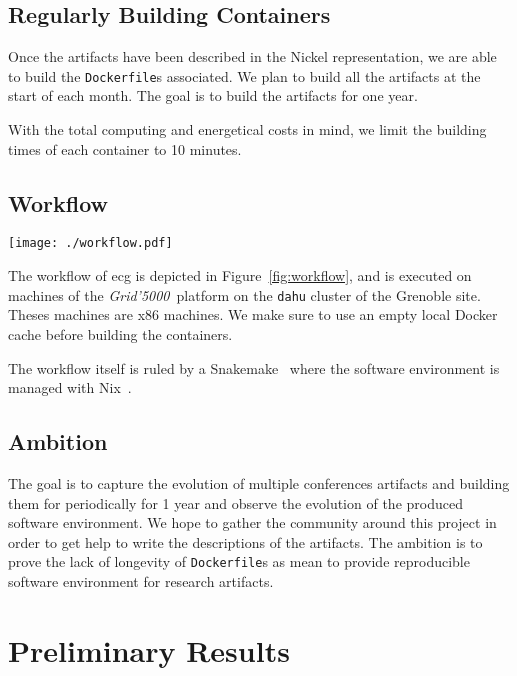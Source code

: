 \documentclass[sigconf,natbib=false]{acmart}
\newcommand{\grid}{\emph{Grid'5000}}
\newcommand{\df}{\texttt{Dockerfile}}
\newcommand{\todo}[1]{{\color{red}{TODO: #1}}}
\begin{document}
\subsection{Regularly Building Containers}

Once the artifacts have been described in the Nickel representation, we are able to build the \df s associated.
We plan to build all the artifacts at the start of each month.
The goal is to build the artifacts for one year.

\todo{building patterns, exponential decay}


With the total computing and energetical costs in mind, we limit the building times of each container to 10 minutes.


\subsection{Workflow}

\begin{figure*}
  \centering
  \texttt{[image: ./workflow.pdf]}
  \caption{Workflow}\label{fig:workflow}
\end{figure*}

The workflow of ecg is depicted in Figure~\ref{fig:workflow}, and is executed on machines of the \grid\ platform \cite{grid5000} on the \texttt{dahu} cluster of the Grenoble site.
Theses machines are x86 machines.
We make sure to use an empty local Docker cache before building the containers.

The workflow itself is ruled by a Snakemake~\cite{koster2012snakemake} where the software environment is managed with Nix~\cite{dolstra_nix_2004}.


\subsection{Ambition}

The goal is to capture the evolution of multiple conferences artifacts and building them for periodically for 1 year and observe the evolution of the produced software environment.
We hope to gather the community around this project in order to get help to write the descriptions of the artifacts.
The ambition is to prove the lack of longevity of \df s as mean to provide reproducible software environment for research artifacts.

\newpage
\section{Preliminary Results}
\end{document}
